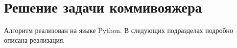 \section{Решение задачи коммивояжера}
Алгоритм реализован на языке Python. В следующих подразделах подробно описана реализация.